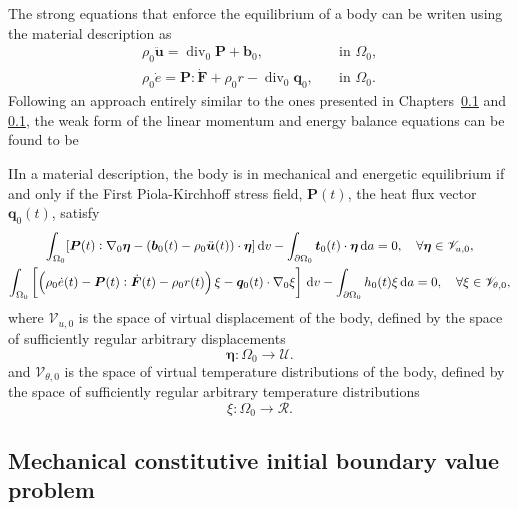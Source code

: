 The strong equations that enforce the equilibrium of a body can be writen using the material description as
\begin{align}
  \rho_0 \ddot{\bm u} = \operatorname{div}_0\bm P + \bm b_0, \quad & \text{in $\Omega_0$},\\
   \rho_0 \dot e = \bm P :\dot{\bm F} + \rho_0 r -\operatorname{div}_0 \bm q_0, \quad & \text{in  $\Omega_0$}.
\end{align}
Following an approach entirely similar to the ones presented in Chapters~\ref{} and \ref{}, the weak form of the linear momentum and energy balance equations can be found to be
\begin{problem}
IIn a material description, the body is in mechanical and energetic equilibrium if and only if the First Piola-Kirchhoff stress field, \(\bm P(t)\), the heat flux vector \(\bm q_0(t)\), satisfy
    \begin{gather}
        \int_{\Omega_0} [\bm{P}(t):\nabla_0 \bm \eta - (\bm b_0(t) - \rho_0 \ddot{\bm u}(t))\cdot \bm \eta]\,\mathrm{d} v - \int_{\partial\Omega_0} \bm t_0(t)\cdot \bm \eta\,\mathrm{d} a = 0,\quad \forall \bm \eta \in \mathscr{V}_{u,0},\\
          \int_{\Omega_0}   \left[\left(\rho_0\dot e (t)- \bm P(t):\dot{\bm F}(t)- \rho_0r(t)\right) \xi - \bm q_0(t)\cdot \nabla_0 \xi\right]\,\mathrm{d} v - \int_{\partial\Omega_0} h_0(t) \xi\,\mathrm{d} a = 0,\quad \forall \xi \in \mathscr{V}_{\theta,0},
    \end{gather}
 where $\mathscr{V}_{u,0}$ is the space of virtual displacement of the body, defined by the space of sufficiently regular arbitrary displacements
 \begin{equation}
     \bm \eta\colon \Omega_0\to \mathscr{U}.
 \end{equation}
 and  $\mathscr{V}_{\theta,0}$ is the space of virtual temperature distributions of the body, defined by the space of sufficiently regular arbitrary temperature distributions
 \begin{equation}
     \xi\colon \Omega_0\to \mathscr R.
 \end{equation}
\end{problem}

\subsection{Mechanical constitutive initial boundary value problem}

